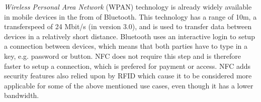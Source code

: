 \textit{Wireless Personal Area Network} (WPAN) technology is already widely available in mobile devices in the from of Bluetooth. This technology has a range of 10m, a transferspeed of 24 Mbit/s (in version 3.0), and is used to transfer data between devices in a relatively short distance. Bluetooth uses an interactive login to setup a connection between devices, which means that both parties have to type in a key, e.g. password or button. NFC does not require this step and is therefore faster to setup a connection, which is prefered for payment or access. NFC adds security features also relied upon by RFID which cause it to be considered more applicable for some of the above mentioned use cases, even though it has a lower bandwidth.





